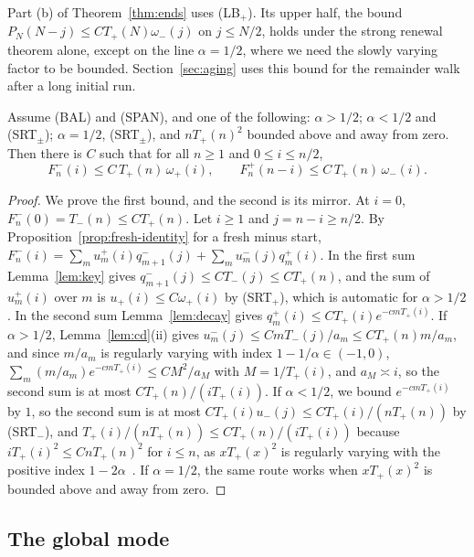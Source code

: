 Part (b) of Theorem~\ref{thm:ends} uses (LB$_\plus$). Its upper half, the bound
$P_N(N-j)\le CT_\plus(N)\omega_\minus(j)$ on $j\le N/2$, holds under the strong renewal theorem
alone, except on the line $\alpha=1/2$, where we need the slowly varying factor to be
bounded. Section~\ref{sec:aging} uses this bound for the remainder walk after a long initial
run.

\begin{lemma}\label{lem:E}
Assume (BAL) and (SPAN), and one of the following: $\alpha>1/2$; $\alpha<1/2$ and (SRT$_\pm$);
$\alpha=1/2$, (SRT$_\pm$), and $nT_\plus(n)^2$ bounded above and away from zero. Then there is
$C$ such that for all $n\ge1$ and $0\le i\le n/2$,
\[
 F^\minus_n(i)\le C\,T_\plus(n)\,\omega_\plus(i),\qquad F^\plus_n(n-i)\le C\,T_\plus(n)\,\omega_\minus(i).
\]
\end{lemma}

\begin{proof}
We prove the first bound, and the second is its mirror. At $i=0$, $F^\minus_n(0)=T_\minus(n)\le CT_\plus(n)$.
Let $i\ge1$ and $j=n-i\ge n/2$. By Proposition~\ref{prop:fresh-identity} for a fresh minus start,
$F^\minus_n(i)=\sum_mu^\plus_m(i)q^\minus_{m+1}(j)+\sum_mu^\minus_m(j)q^\plus_m(i)$. In the first sum
Lemma~\ref{lem:key} gives $q^\minus_{m+1}(j)\le CT_\minus(j)\le CT_\plus(n)$, and the sum of
$u^\plus_m(i)$ over $m$ is $u_\plus(i)\le C\omega_\plus(i)$ by (SRT$_\plus$), which is automatic for
$\alpha>1/2$. In the second sum Lemma~\ref{lem:decay} gives
$q^\plus_m(i)\le CT_\plus(i)e^{-cmT_\plus(i)}$. If $\alpha>1/2$, Lemma~\ref{lem:cd}(ii) gives
$u^\minus_m(j)\le CmT_\minus(j)/a_m\le CT_\plus(n)m/a_m$, and since $m/a_m$ is regularly varying with
index $1-1/\alpha\in(-1,0)$, $\sum_m(m/a_m)e^{-cmT_\plus(i)}\le CM^2/a_M$ with $M=1/T_\plus(i)$, and
$a_M\asymp i$, so the second sum is at most $CT_\plus(n)/(iT_\plus(i))$. If $\alpha<1/2$, we bound
$e^{-cmT_\plus(i)}$ by $1$, so the second sum is at most
$CT_\plus(i)u_\minus(j)\le CT_\plus(i)/(nT_\plus(n))$ by (SRT$_\minus$), and
$T_\plus(i)/(nT_\plus(n))\le CT_\plus(n)/(iT_\plus(i))$ because $iT_\plus(i)^2\le CnT_\plus(n)^2$ for
$i\le n$, as $xT_\plus(x)^2$ is regularly varying with the positive index
$1-2\alpha$~\cite[Theorem~1.5.3]{bgt1989}. If $\alpha=1/2$, the same route works when $xT_\plus(x)^2$ is
bounded above and away from zero.
\end{proof}

\subsection{The global mode}

